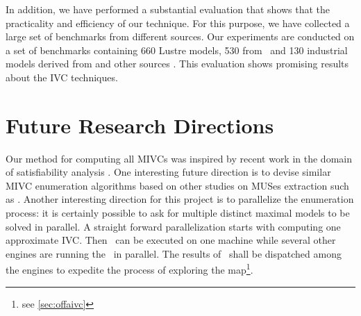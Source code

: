 In addition, we have performed a substantial evaluation that shows that the practicality and efficiency of our technique. For this purpose, we have collected a large set of benchmarks from different sources. Our experiments are conducted on a set of benchmarks containing 660 Lustre models, 530 from~\cite{Hagen08:FMCAD, piskac2016} and 130 industrial models derived from \cite{hilt2013} and other sources \cite{piskac2016, NFM2015:backes}. This evaluation shows promising results about the IVC techniques.

\section{Future Research Directions}
Our method for computing all MIVCs was inspired by recent work in the domain of satisfiability analysis \cite{marco2016fast}. One interesting future direction is to devise similar MIVC enumeration algorithms based on other studies on MUSes extraction such as \cite{nadel2014accelerated}.
Another interesting direction for this project is to parallelize the enumeration process: it is certainly possible to ask for multiple distinct maximal models to be solved in parallel.
A straight forward parallelization starts with computing one approximate IVC. Then \mustalg\ can be executed on one machine while several other engines are running the \aivcalg\ in parallel. The results of \mustalg\ shall be dispatched among the engines to expedite the process of exploring the map\footnote{see \ref{sec:offaivc}}.

